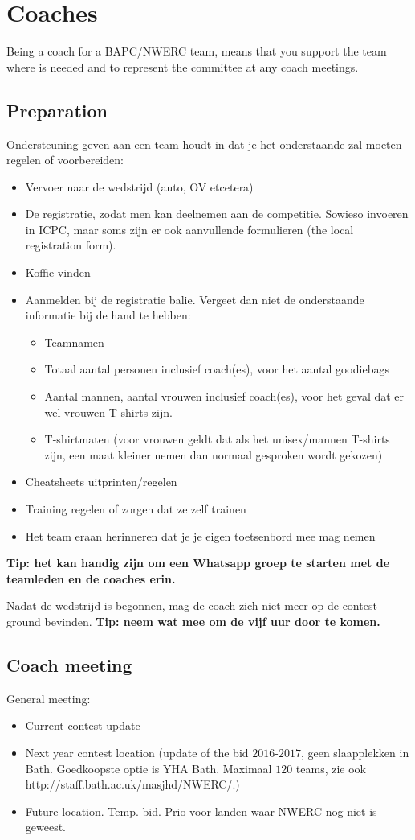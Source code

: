 \section{Coaches}
Being a coach for a BAPC/NWERC team, means that you support the team where is needed and to represent the committee at any coach meetings.

	\subsection{Preparation}
	Ondersteuning geven aan een team houdt in dat je het onderstaande zal moeten regelen of voorbereiden:
	\begin{itemize}
	\item Vervoer naar de wedstrijd (auto, OV etcetera)
	\item De registratie, zodat men kan deelnemen aan de competitie. Sowieso invoeren in ICPC, maar soms zijn er ook aanvullende formulieren (the local registration form).
	\item Koffie vinden
	\item Aanmelden bij de registratie balie. Vergeet dan niet de onderstaande informatie bij de hand te hebben:
		\begin{itemize}
		\item 	Teamnamen
		\item 	Totaal aantal personen inclusief coach(es), voor het aantal goodiebags
		\item 	Aantal mannen, aantal vrouwen inclusief coach(es), voor het geval dat er wel vrouwen T-shirts zijn.
		\item 	T-shirtmaten (voor vrouwen geldt dat als het unisex/mannen T-shirts zijn, een maat kleiner nemen dan normaal gesproken wordt gekozen)
		\end{itemize}
	\item Cheatsheets uitprinten/regelen
	\item Training regelen of zorgen dat ze zelf trainen
	\item Het team eraan herinneren dat je je eigen toetsenbord mee mag nemen
	\end{itemize}
	\textbf{Tip: het kan handig zijn om een Whatsapp groep te starten met de teamleden en de coaches erin.}

	Nadat de wedstrijd is begonnen, mag de coach zich niet meer op de contest ground bevinden. \textbf{Tip: neem wat mee om de vijf uur door te komen.}
	
	\subsection{Coach meeting}\label{CoachMeeting}
	General meeting:
	\begin{itemize}
	\item Current contest update
	\item Next year contest location (update of the bid $2016$-$2017$, geen slaapplekken in Bath. Goedkoopste optie is YHA Bath. Maximaal $120$ teams, zie ook http://staff.bath.ac.uk/masjhd/NWERC/.)
	\item Future location. Temp. bid. Prio voor landen waar NWERC nog niet is geweest.
	\end{itemize}		
	
